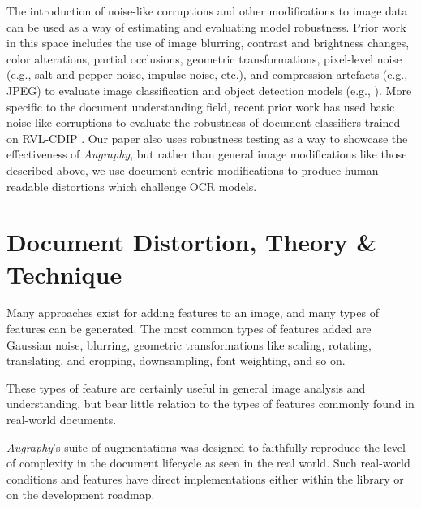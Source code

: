 \documentclass[runningheads]{llncs}
\begin{document}
The introduction of noise-like corruptions and other modifications to image data can be used as a way of estimating and evaluating model robustness.
Prior work in this space includes the use of image blurring, contrast and brightness changes, color alterations, partial occlusions, geometric transformations, pixel-level noise (e.g., salt-and-pepper noise, impulse noise, etc.), and compression artefacts (e.g., JPEG) to evaluate image classification and object detection models (e.g., \cite{image-quality-impact,imagenet-c,pathology-recommendations,Hosseini2017-kn-google-api,face-recognition-impact,pathology-schomig,Vasiljevic2016-al-bluring-impact}).
More specific to the document understanding field, recent prior work has used basic noise-like corruptions to evaluate the robustness of document classifiers trained on RVL-CDIP \cite{saifullah-2022}.
Our paper also uses robustness testing as a way to showcase the effectiveness of \emph{Augraphy}, but rather than general image modifications like those described above, we use document-centric modifications to produce human-readable distortions which challenge OCR models.

\section{Document Distortion, Theory \& Technique}
Many approaches exist for adding features to an image, and many types of features can be generated. The most common types of features added are Gaussian noise, blurring, geometric transformations like scaling, rotating, translating, and cropping, downsampling, font weighting, and so on.

These types of feature are certainly useful in general image analysis and understanding, but bear little relation to the types of features commonly found in real-world documents.

\emph{Augraphy}'s suite of augmentations was designed to faithfully reproduce the level of complexity in the document lifecycle as seen in the real world.  Such real-world conditions and  features have direct implementations either within the library or on the development roadmap.
\end{document}

